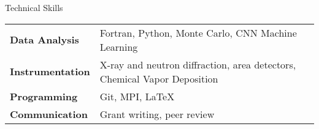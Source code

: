 
\begin{rubric}{Technical Skills}
\begin{tabular}{@{}ll@{}}
\textbf{Data Analysis} & Fortran, Python, Monte Carlo, CNN Machine Learning \\
\textbf{Instrumentation} & X-ray and neutron diffraction, area detectors, Chemical Vapor Deposition\\
\textbf{Programming} & Git, MPI, LaTeX\\
\textbf{Communication} & Grant writing, peer review\\
\end{tabular}
\end{rubric}
